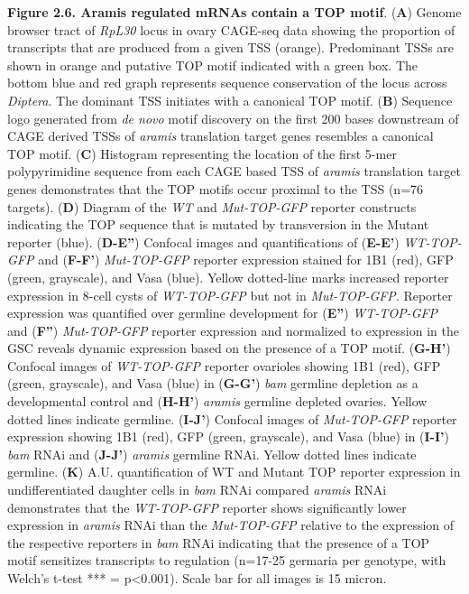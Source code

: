 \documentclass[12pt,twoside]{reedthesis}
\begin{document}
\textbf{Figure 2.6. Aramis regulated mRNAs contain a TOP motif}. (\textbf{A}) Genome
browser tract of \emph{RpL30} locus in ovary CAGE-seq data showing the
proportion of transcripts that are produced from a given TSS (orange).
Predominant TSSs are shown in orange and putative TOP motif indicated
with a green box. The bottom blue and red graph represents sequence
conservation of the locus across \emph{Diptera}. The dominant TSS initiates
with a canonical TOP motif. (\textbf{B}) Sequence logo generated from \emph{de
novo} motif discovery on the first 200 bases downstream of CAGE derived
TSSs of \emph{aramis} translation target genes resembles a canonical TOP
motif. (\textbf{C}) Histogram representing the location of the first 5-mer
polypyrimidine sequence from each CAGE based TSS of \emph{aramis} translation
target genes demonstrates that the TOP motifs occur proximal to the TSS
(n=76 targets). (\textbf{D}) Diagram of the \emph{WT} and \emph{Mut-TOP-GFP} reporter
constructs indicating the TOP sequence that is mutated by transversion
in the Mutant reporter (blue). (\textbf{D-E''}) Confocal images and
quantifications of (\textbf{E-E'}) \emph{WT-TOP-GFP} and (\textbf{F-F'}) \emph{Mut-TOP-GFP}
reporter expression stained for 1B1 (red), GFP (green, grayscale), and
Vasa (blue). Yellow dotted-line marks increased reporter expression in
8-cell cysts of \emph{WT-TOP-GFP} but not in \emph{Mut-TOP-GFP}. Reporter
expression was quantified over germline development for (\textbf{E''})
\emph{WT-TOP-GFP} and (\textbf{F''}) \emph{Mut-TOP-GFP} reporter expression and
normalized to expression in the GSC reveals dynamic expression based on
the presence of a TOP motif. (\textbf{G-H'}) Confocal images of \emph{WT-TOP-GFP}
reporter ovarioles showing 1B1 (red), GFP (green, grayscale), and Vasa
(blue) in (\textbf{G-G'}) \emph{bam} germline depletion as a developmental control
and (\textbf{H-H'}) \emph{aramis} germline depleted ovaries. Yellow dotted lines
indicate germline. (\textbf{I-J'}) Confocal images of \emph{Mut-TOP-GFP} reporter
expression showing 1B1 (red), GFP (green, grayscale), and Vasa (blue) in
(\textbf{I-I'}) \emph{bam} RNAi and (\textbf{J-J'}) \emph{aramis} germline RNAi. Yellow
dotted lines indicate germline. (\textbf{K}) A.U. quantification of WT and
Mutant TOP reporter expression in undifferentiated daughter cells in
\emph{bam} RNAi compared \emph{aramis} RNAi demonstrates that the \emph{WT-TOP-GFP}
reporter shows significantly lower expression in \emph{aramis} RNAi than the
\emph{Mut-TOP-GFP} relative to the expression of the respective reporters in
\emph{bam} RNAi indicating that the presence of a TOP motif sensitizes
transcripts to regulation (n=17-25 germaria per genotype, with Welch's
t-test *** = p\textless0.001). Scale bar for all images is 15 micron.
\end{document}
